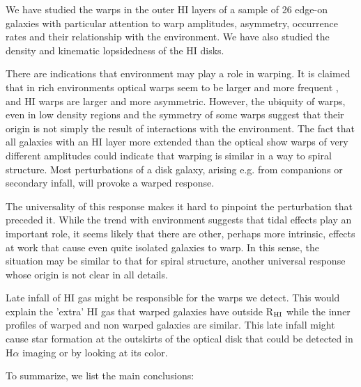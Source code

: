 \documentclass{aa}
\begin{document}
We have studied the warps in the outer HI layers of a sample of 26 edge-on
galaxies with particular attention to warp amplitudes, asymmetry,
occurrence rates and their relationship with the environment. We have also studied
the density and kinematic lopsidedness of the HI disks. 

There are indications that environment may play a role in
warping. It is claimed that in rich environments optical warps seem to
be larger and more
frequent \cite{res}, and HI warps are larger and more 
asymmetric. However, the ubiquity of warps, even in low density regions and
the symmetry of some warps suggest that their origin is not simply
the result of interactions with the environment. The fact that all
galaxies with an HI layer more 
extended than the optical show warps of very different amplitudes
could indicate that warping is similar in a way to spiral
structure. Most perturbations of a disk galaxy, arising e.g. from
companions or secondary infall, will provoke a warped response.

The universality of this response makes it hard to pinpoint the
perturbation that preceded it. While the trend with environment
suggests that tidal effects play an important role, it seems likely
that there are other, perhaps more intrinsic, effects at work that
cause even quite isolated galaxies to warp. In this sense, the
situation may be similar to that for spiral structure, another
universal response whose origin is not clear in all details.

Late infall of HI gas might
be responsible for the warps we detect. This would explain the 'extra'
HI gas that warped galaxies have outside R$_{\rm HI}$ while the inner
profiles of warped and non warped galaxies are similar. This late
infall might cause star formation at the outskirts of the
optical disk that could be detected in H$\alpha$ imaging or by looking
at its color.

To summarize, we list the main conclusions:
\end{document}
